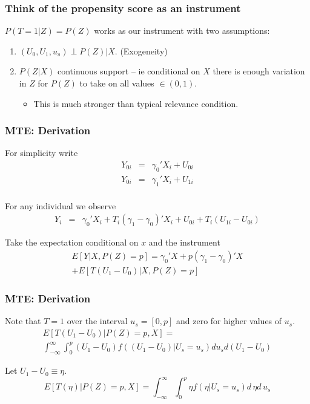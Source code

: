 \begin{frame}
  \frametitle{Think of the propensity score as an instrument}
  
  $P(T=1 | Z) = P(Z)$ works as our instrument with two assumptions:
  \begin{enumerate}
  \item $(U_0, U_1, u_s) \perp P(Z) | X$. (Exogeneity)
  \item $P(Z | X)$ continuous support -- ie conditional on $X$ there is enough variation in $Z$ for $P(Z)$ to take on all values $\in(0,1)$.
  \begin{itemize}
  \item This is much stronger than typical \alert{relevance} condition. 
  \end{itemize}
  \end{enumerate}
\end{frame}

\begin{frame}
\frametitle{MTE: Derivation}
For simplicity write 
\begin{eqnarray*}
Y_{0i} &=& \gamma_0' X_i + U_{0i}\\
Y_{0i} &=& \gamma_1' X_i + U_{1i}\\
\end{eqnarray*}

For any individual we observe 
\begin{eqnarray*}
  Y_i &=& \gamma_0' X_i + T_i(\gamma_1 - \gamma_0)' X_i + U_{0i} + T_i(U_{1i} - U_{0i})
\end{eqnarray*}

\pause 

Take the expectation conditional on $x$ and the instrument
\begin{multline*}
  E[Y| X,P(Z)=p] = \gamma_0' X + p(\gamma_1 - \gamma_0)'X \\ + E[T(U_1 - U_0)|X,P(Z)=p] 
\end{multline*}

\end{frame}
  

\begin{frame}
\frametitle{MTE: Derivation}
Note that $T=1$ over the interval $u_s = [0,p]$ and zero for higher values of $u_s$. 
\begin{multline*}
E[T(U_1 - U_0) | P(Z) =p,X] = \\ \int_{-\infty}^{\infty} \int_{0}^{p} (U_1 - U_0) f((U_1-U_0) | U_s = u_s) d u_s d(U_1 -U_0)
\end{multline*}

Let $U_1-U_0 \equiv \eta$.
$$ E[T(\eta) | P(Z) =p,X] = \int_{-\infty}^{\infty} \int_{0}^{p} \eta f(\eta | U_s = u_s)  d\, \eta d\, u_s $$
\end{frame}


